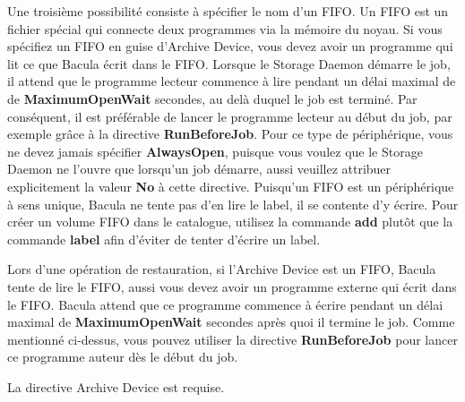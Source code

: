 \begin{description}
   Une troisi\`eme possibilit\'e consiste \`a sp\'ecifier le nom d'un FIFO. Un FIFO est un 
   fichier sp\'ecial qui connecte deux programmes via la m\'emoire du noyau. Si vous 
   sp\'ecifiez un FIFO en guise d'Archive Device, vous devez avoir un programme qui 
   lit ce que Bacula \'ecrit dans le FIFO. Lorsque le Storage Daemon d\'emarre le job, 
   il attend que le programme lecteur commence \`a lire pendant un d\'elai maximal de
   de {\bf MaximumOpenWait} secondes, au del\`a duquel le job est termin\'e. Par cons\'equent, 
   il est pr\'ef\'erable de lancer le programme lecteur au d\'ebut du job, par exemple 
   gr\^ace \`a la directive {\bf RunBeforeJob}. Pour ce type de p\'eriph\'erique, vous ne devez 
   jamais sp\'ecifier {\bf AlwaysOpen}, puisque vous voulez que le Storage Daemon 
   ne l'ouvre que lorsqu'un job d\'emarre, aussi veuillez attribuer  explicitement 
   la valeur {\bf No} \`a cette directive. Puisqu'un FIFO est un p\'eriph\'erique \`a sens 
   unique, Bacula ne tente pas d'en lire le label, il se contente d'y \'ecrire. Pour 
   cr\'eer un volume FIFO dans le catalogue, utilisez la commande {\bf add}  plut\^ot 
   que la commande {\bf label} afin d'\'eviter de tenter d'\'ecrire un label.
   
   Lors d'une op\'eration de restauration, si l'Archive Device est un FIFO, Bacula 
   tente de lire le FIFO, aussi vous devez avoir un programme externe qui \'ecrit dans 
   le FIFO. Bacula attend que ce programme commence \`a \'ecrire pendant un d\'elai 
   maximal de {\bf MaximumOpenWait} secondes apr\`es quoi il termine le job. Comme 
   mentionn\'e ci-dessus, vous pouvez utiliser la directive {\bf RunBeforeJob} pour 
   lancer ce programme auteur d\`es le d\'ebut du job.
  
   La directive Archive Device est requise. 


\end{description}

